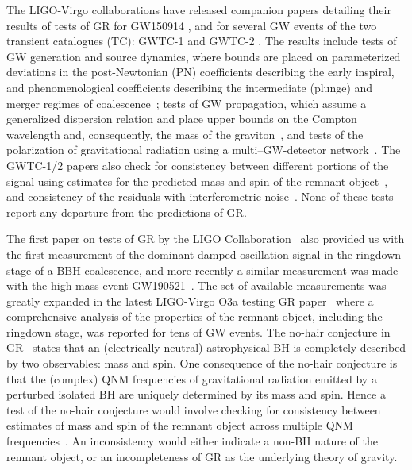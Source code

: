 The LIGO-Virgo collaborations have released companion papers detailing their results
of tests of GR for GW150914 \cite{TheLIGOScientific:2016src}, and for several GW events of
the two transient catalogues (TC): GWTC-1 \cite{LIGOScientific:2018mvr,LIGOScientific:2019fpa}  and GWTC-2 \cite{Abbott:2020niy,Abbott:2020jks}.
The results include tests of GW generation and source dynamics, where bounds are placed on
parameterized deviations in the post-Newtonian (PN) coefficients describing
the early inspiral, and
phenomenological coefficients describing the intermediate (plunge) and
merger regimes of coalescence~\cite{Arun:2006hn,Arun:2006yw,Agathos:2013upa,Abbott:2018lct}; tests of GW
propagation, which assume a generalized dispersion relation and place
upper bounds on the Compton wavelength and, consequently, the mass of
the graviton~\cite{Abbott:2017vtc,Samajdar:2017mka}, and tests of the
polarization of gravitational radiation using a
multi--GW-detector network~\cite{Abbott:2017oio,Isi:2017fbj}. The GWTC-1/2 papers also
check for consistency between different portions of the signal using estimates for the predicted mass and spin of the remnant
object~\cite{Ghosh:2016xx,Ghosh:2017gfp,TheLIGOScientific:2016src}, and
consistency of the residuals with interferometric
noise~\cite{Ghonge:2020suv,LIGOScientific:2019fpa}. None of these tests report any
departure from the predictions of GR.

The first paper on tests of GR by the LIGO Collaboration~\cite{TheLIGOScientific:2016src} also provided us with the first measurement of the dominant damped-oscillation signal in the ringdown stage of a BBH
coalescence, and more recently a similar measurement was made with the high-mass event GW190521~\cite{Abbott:2020tfl,Abbott:2020mjq}. The set of available measurements was greatly expanded in the latest LIGO-Virgo O3a testing GR paper~\cite{Abbott:2020jks} where a comprehensive analysis of the properties of the remnant object, including the ringdown stage, was reported for tens of GW events. The no-hair conjecture in GR~\cite{Carter:1971zc,Hansen:1974zz} states that an (electrically neutral) astrophysical BH is completely described by two observables: mass and spin. One
consequence of the no-hair conjecture is that the (complex) QNM
frequencies of gravitational radiation emitted by a perturbed isolated
BH are uniquely determined by its mass and spin. Hence
a test of the no-hair conjecture would involve checking for
consistency between estimates of mass and spin of the remnant object
across multiple QNM frequencies~\cite{Dreyer:2003bv,Berti:2005ys}. An inconsistency would either
indicate a non-BH nature of the remnant object, or an incompleteness
of GR as the underlying theory of gravity.

